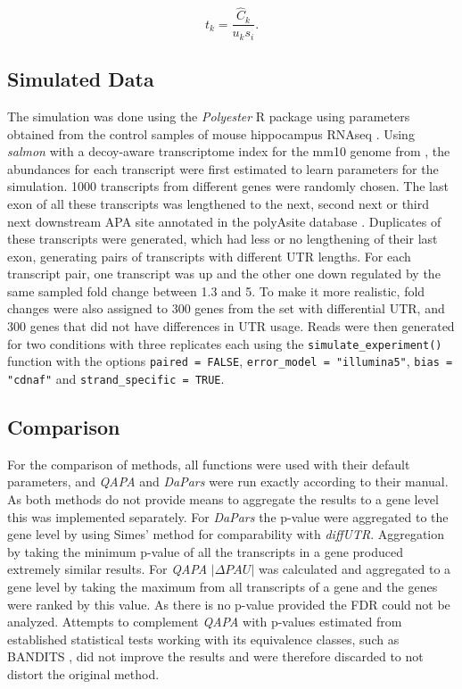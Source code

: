 \documentclass{bmcart}
\begin{document}
\begin{equation}
    t_{k} =\frac{\hat{C}_{k}}{u_{k}s_{i}}.
\end{equation}

\subsection{Simulated Data}
\label{sec:sim}
The simulation was done using the \textit{Polyester} R package  \cite{Frazee2015Polyester:Expression} using parameters obtained from the control samples of mouse hippocampus RNAseq \cite{Fontes2017Activity-DependentPotentiation}. Using \textit{salmon} \cite{PatroSalmon2017} with a decoy-aware transcriptome index for the mm10 genome from \cite{Stolarczyk2020Refgenie:Manager}, the abundances for each transcript were first estimated to learn parameters for the simulation. 1000 transcripts from different genes were randomly chosen. The last exon of all these transcripts was lengthened to the next, second next or third next downstream APA site annotated in the polyAsite database \cite{Herrmann2020PolyASiteSequencing}. Duplicates of these transcripts were generated, which had less or no lengthening of their last exon, generating pairs of transcripts with different UTR lengths. For each transcript pair, one transcript was up and the other one down regulated by the same sampled fold change between 1.3 and 5. To make it more realistic, fold changes were also assigned to 300 genes from the set with differential UTR, and 300 genes that did not have differences in UTR usage. Reads were then generated for two conditions with three replicates each using the \texttt{simulate\_experiment()} function with the options \texttt{paired = FALSE},  \texttt{error\_model = "illumina5"}, 
\texttt{bias = "cdnaf"} and \texttt{strand\_specific = TRUE}.

\subsection{Comparison}

For the comparison of methods, all functions were used with their default parameters, and  \textit{QAPA} and \textit{DaPars} were run exactly according to their manual. As both methods do not provide means to aggregate the results to a gene level this was implemented separately. For \textit{DaPars} the p-value were aggregated to the gene level by using Simes' method for comparability with \textit{diffUTR}. Aggregation by taking the minimum p-value of all the transcripts in a gene produced extremely similar results. For \textit{QAPA} $|\Delta PAU|$ was calculated and aggregated to a gene level by taking the maximum from all transcripts of a gene and the genes were ranked by this value. As there is no p-value provided the FDR could not be analyzed. Attempts to complement \textit{QAPA} with p-values estimated from established statistical tests working with its equivalence classes, such as BANDITS \cite{Tiberi2020BANDITS:Uncertainty}, did not improve the results and were therefore discarded to not distort the original method.
\end{document}
